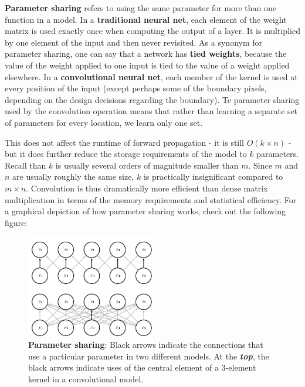 \documentclass{report}
\begin{document}
\noindent \textbf{Parameter sharing} refers to using the same parameter for more than one function in a model. In a \textbf{traditional neural net}, each element of the weight matrix is used exactly once when computing the output of a layer. It is multiplied by one element of the input and then never revisited. As a synonym for parameter sharing, one can say that a network has \textbf{tied weights}, because the value of the weight applied to one input is tied to the value of a weight applied elsewhere. In a \textbf{convolutional neural net}, each member of the kernel is used at every position of the input (except perhaps some of the boundary pixels, depending on the design decisions regarding the boundary). Te parameter sharing used by the convolution operation means that rather than learning a separate set of parameters for every location, we learn only one set. \newline

\noindent This does not affect the runtime of forward propagation - it is still $O(k \times n)$ - but it does further reduce the storage requirements of the model to $k$ parameters. Recall than $k$ is usually several orders of magnitude smaller than $m$. Since $m$ and $n$ are usually roughly the same size, $k$ is practically insignificant compared to $m \times n$. Convolution is thus dramatically more efficient than dense matrix multiplication in terms of the memory requirements and statistical efficiency. For a graphical depiction of how parameter sharing works, check out the following figure:

\begin{figure}[h!]
  \centering
  \includegraphics[width=0.5\textwidth]{Convolutional_Networks/parameter_sharing.png}
  \caption{\textbf{Parameter sharing}: Black arrows indicate the connections that use a particular parameter in two different models. At the \textbf{\textit{top}}, the black arrows indicate uses of the central element of a 3-element kernel in a convolutional model.}
\end{figure}

%
%

\end{document}
